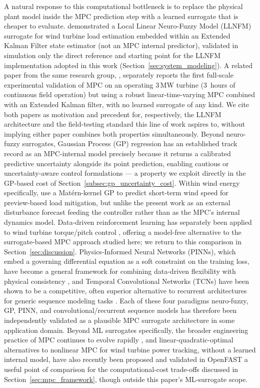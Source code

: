 A natural response to this computational bottleneck is to replace the
physical plant model inside the MPC prediction step with a learned
surrogate that is cheaper to evaluate. \citet{klein2024} demonstrated a Local Linear Neuro-Fuzzy Model
(LLNFM) surrogate for wind turbine load estimation  embedded within an
Extended Kalman Filter state estimator (not an MPC internal predictor),
validated in simulation only  the direct reference and starting point
for the LLNFM implementation adopted in this work
(Section~\ref{sec:system_modeling}). A related paper from the same
research group, \citet{klein2025}, separately reports the first
full-scale experimental validation of MPC on an operating 3\,MW turbine
(3~hours of continuous field operation)  but using a robust
linear-time-varying MPC combined with an Extended Kalman filter, with no
learned surrogate of any kind. We cite both papers as motivation and
precedent for, respectively, the LLNFM architecture and the field-testing
standard this line of work aspires to, without implying either paper
combines both properties simultaneously. Beyond neuro-fuzzy
surrogates, Gaussian Process (GP) regression has an established track
record as an MPC-internal model precisely because it returns a calibrated
predictive uncertainty alongside its point prediction, enabling cautious
or uncertainty-aware control formulations \citep{kocijan2004,hewing2020} —
a property we exploit directly in the GP-based cost of
Section~\ref{subsec:gp_uncertainty_cost}. Within wind energy specifically,
\citet{liu_wind_2018} use a Mat\'ern-kernel GP to predict short-term wind
speed for preview-based load mitigation, but  unlike the present
work  as an external disturbance forecast feeding the controller
rather than as the MPC's internal dynamics model. Data-driven
reinforcement learning has separately been applied to wind turbine
torque/pitch control \citep{xie_data-driven_2023}, offering a
model-free alternative to the surrogate-based MPC approach studied
here; we return to this comparison in
Section~\ref{sec:discussion}. Physics-Informed Neural Networks
(PINNs), which embed a governing differential equation as a soft
constraint on the training loss, have become a general framework for
combining data-driven flexibility with physical consistency
\citep{raissi2019,karniadakis2021}, and Temporal Convolutional Networks
(TCNs) have been shown to be a competitive, often superior alternative to
recurrent architectures for generic sequence modeling tasks
\citep{bai2018}. Each of these four paradigms neuro-fuzzy, GP, PINN,
and convolutional/recurrent sequence models has therefore been
independently validated as a plausible MPC surrogate architecture in some
application domain. Beyond ML surrogates specifically, the broader
engineering practice of MPC continues to evolve rapidly
\citep{schwenzer2021}, and linear-quadratic-optimal alternatives to
nonlinear MPC for wind turbine power tracking, without a learned
internal model, have also recently been proposed and validated in
OpenFAST \citep{grapentin2022,grapentin2024}  a useful point of
comparison for the computational-cost trade-offs discussed in
Section~\ref{sec:mpc_framework}, though outside this paper's
ML-surrogate scope.

